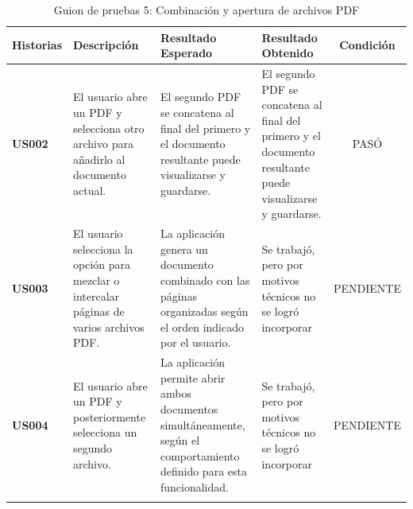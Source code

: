 \begin{longtable}{ | p{2cm} | p{3cm} | p{4cm} | p{4cm} | c |}
      \hline
      \textbf{Historias} & \textbf{Descripción} & \textbf{Resultado Esperado} & \textbf{Resultado Obtenido} & \textbf{Condición}\\
      \hline
      \textbf{US002} & El usuario abre un PDF y selecciona otro archivo para añadirlo al documento actual. & El segundo PDF se concatena al final del primero y el documento resultante puede visualizarse y guardarse. & El segundo PDF se concatena al final del primero y el documento resultante puede visualizarse y guardarse. & PASÓ \\
      \hline

      \textbf{US003} & El usuario selecciona la opción para mezclar o intercalar páginas de varios archivos PDF. & La aplicación genera un documento combinado con las páginas organizadas según el orden indicado por el usuario. & Se trabajó, pero por motivos técnicos no se logró incorporar & PENDIENTE \\
      \hline
 
      \textbf{US004} & El usuario abre un PDF y posteriormente selecciona un segundo archivo. & La aplicación permite abrir ambos documentos simultáneamente, según el comportamiento definido para esta funcionalidad. & Se trabajó, pero por motivos técnicos no se logró incorporar & PENDIENTE \\
      \hline
      
      \caption{Guion de pruebas 5: Combinación y apertura de archivos PDF}
      \label{TestScript1}
\end{longtable}